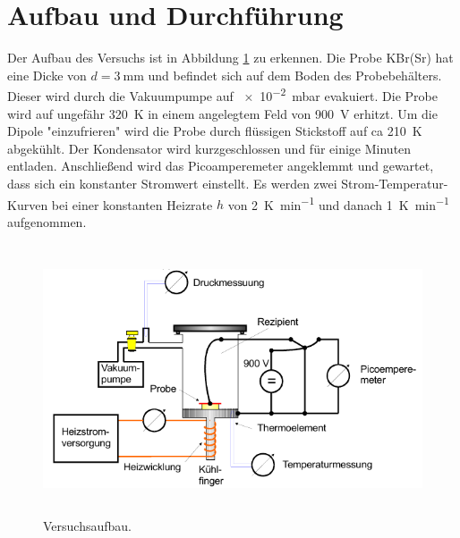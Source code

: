 \newpage
\section{Aufbau und Durchführung}
\label{sec:Durchführung}
Der Aufbau des Versuchs ist in Abbildung \ref{fig:Versuch} zu erkennen.
Die Probe KBr(Sr) hat eine Dicke von $d=\SI{3}{\milli\meter}$ und befindet sich auf dem Boden des Probebehälters.
Dieser wird durch die Vakuumpumpe auf \SI{e-2}{\milli\bar} evakuiert.
Die Probe wird auf ungefähr \SI{320}{\kelvin} in einem angelegtem Feld von \SI{900}{\volt} erhitzt.
Um die Dipole "einzufrieren" wird die Probe durch flüssigen Stickstoff auf ca \SI{210}{\kelvin} abgekühlt.
Der Kondensator wird kurzgeschlossen und für einige Minuten entladen.
Anschließend wird das Picoamperemeter angeklemmt und gewartet, dass sich ein konstanter Stromwert einstellt.
Es werden zwei Strom-Temperatur-Kurven bei einer konstanten Heizrate $h$ von \SI{2}{\kelvin\per\minute} und danach \SI{1}{\kelvin\per\minute} aufgenommen.
\begin{figure}[htb]
    \centering
    \includegraphics[height=8cm]{pics/Versuch.png}
    \caption{Versuchsaufbau. \cite{anleitung}}
    \label{fig:Versuch}
  \end{figure}
  \FloatBarrier
\FloatBarrier